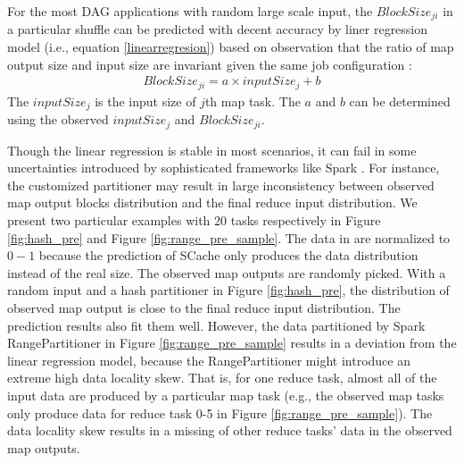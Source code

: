 For the most DAG applications with random large scale input, 
the $BlockSize_{ji}$ in a particular shuffle can be predicted with decent accuracy by liner regression model (i.e., equation \ref{linearregresion}) based on observation that the ratio of map output size and input size are invariant given the same job configuration \cite{guo2017ishuffle, predict}: 
\begin{equation}
\label{linearregresion}
\begin{aligned}
	BlockSize_{ji} = a \times inputSize_j + b
\end{aligned}
\end{equation}
The $inputSize_j$ is the input size of $j$th map task. 
The $a$ and $b$ can be determined using the observed $inputSize_j$ and $BlockSize_{ji}$.

Though the linear regression is stable in most scenarios, it can fail in some uncertainties introduced by sophisticated frameworks like Spark \cite{apachespark}.  
For instance, the customized partitioner may result in large inconsistency between observed map output blocks distribution and the final reduce input distribution. 
We present two particular examples with 20 tasks respectively in Figure \ref{fig:hash_pre} and Figure \ref{fig:range_pre_sample}. 
The data in are normalized to $0-1$ because the prediction of SCache only produces the data distribution instead of the real size. 
The observed map outputs are randomly picked. 
With a random input and a hash partitioner in Figure \ref{fig:hash_pre}, the distribution of observed map output is close to the final reduce input distribution. 
The prediction results also fit them well. 
However, the data partitioned by Spark RangePartitioner \cite{apachespark} in Figure \ref{fig:range_pre_sample} results in a deviation from the linear regression model, because the RangePartitioner might introduce an extreme high data locality skew. 
That is, for one reduce task, almost all of the input data are produced by a particular map task (e.g., the observed map tasks only produce data for reduce task 0-5 in Figure \ref{fig:range_pre_sample}).
The data locality skew results in a missing of other reduce tasks' data in the observed map outputs.

